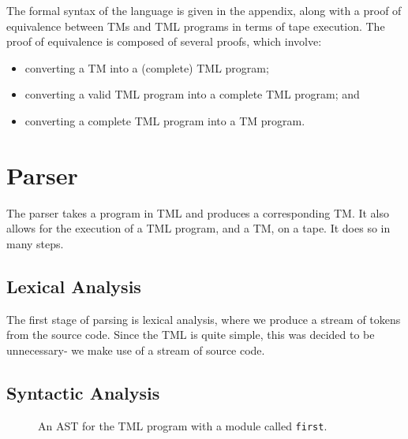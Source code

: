 The formal syntax of the language is given in the appendix, along with a proof of equivalence between TMs and TML programs in terms of tape execution. The proof of equivalence is composed of several proofs, which involve:
\begin{itemize}
    \item converting a TM into a (complete) TML program;
    \item converting a valid TML program into a complete TML program; and
    \item converting a complete TML program into a TM program.
\end{itemize}

\section{Parser}
The parser takes a program in TML and produces a corresponding TM. It also allows for the execution of a TML program, and a TM, on a tape. It does so in many steps.

\subsection{Lexical Analysis}
The first stage of parsing is lexical analysis, where we produce a stream of tokens from the source code. Since the TML is quite simple, this was decided to be unnecessary- we make use of a stream of source code.

\subsection{Syntactic Analysis}

\begin{figure}[htb]
    \centering
    \caption{An AST for the TML program with a module called \texttt{first}.}
    \label{fig:TML_AST}
\end{figure}

